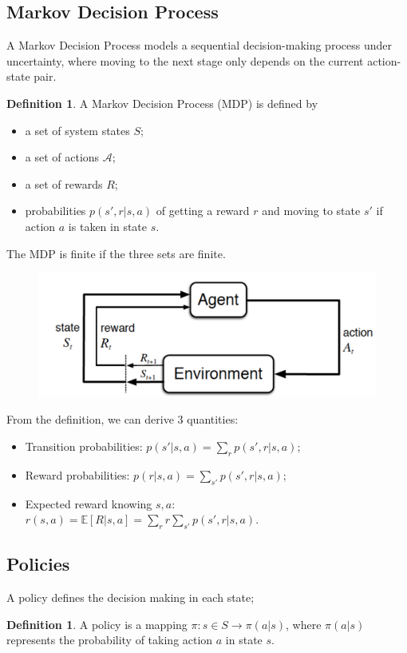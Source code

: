 \documentclass[12pt, openany]{report}
\newcommand{\E}{\mathbb{E}}
\theoremstyle{definition}
\newtheorem{definition}[thm]{Definition}
\begin{document}
\subsection{Markov Decision Process}
A Markov Decision Process models a sequential decision-making process under uncertainty, where moving to the next stage only depends on the current action-state pair.
\begin{definition}
	A Markov Decision Process (MDP) is defined by 
	\begin{itemize}
		\item a set of system states $S$;
		\item a set of actions $\mathcal{A}$;
		\item a set of rewards $R$;
		\item probabilities $p(s',r|s,a)$ of getting a reward $r$ and moving to state $s'$ if action $a$ is taken in state $s$.
	\end{itemize}
	The MDP is finite if the three sets are finite. 
\end{definition}
\begin{figure}[H]
	\centering 
	\includegraphics[width=.6\textwidth]{img/MDP.png}
\end{figure}
From the definition, we can derive 3 quantities:
\begin{itemize}
	\item Transition probabilities: $p(s'|s,a) = \sum_r p(s',r|s,a)$;
	\item Reward probabilities: $p(r|s,a) = \sum_{s'}p(s',r|s,a)$;
	\item Expected reward knowing $s,a$: $r(s,a) = \E[R|s,a] = \sum_rr\sum_{s'}p(s',r|s,a)$.
\end{itemize}
\subsection{Policies}
A policy defines the decision making in each state;
\begin{definition}
	A policy is a mapping $\pi:s\in S\to \pi(a|s)$, where $\pi(a|s)$ represents the probability of taking action $a$ in state $s$.
\end{definition}
\end{document}
